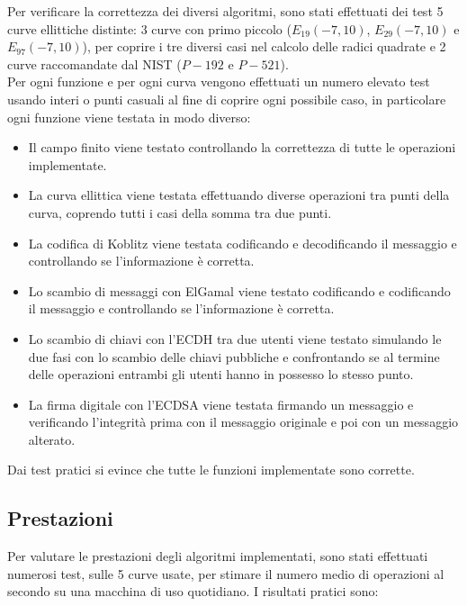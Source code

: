 \documentclass{article}
\begin{document}
	Per verificare la correttezza dei diversi algoritmi, sono stati effettuati dei test 5 curve ellittiche distinte: 
	3 curve con primo piccolo ($E_{19}(-7,10)$, $E_{29}(-7,10)$ e $E_{97}(-7,10)$), per coprire i tre diversi casi 
	nel calcolo delle radici quadrate e 2 curve raccomandate dal NIST ($P-192$ e $P-521$).\\
	
	Per ogni funzione e per ogni curva vengono effettuati un numero elevato test usando interi o punti casuali
	al fine di coprire ogni possibile caso,
	in particolare ogni funzione viene testata in modo diverso:
	
	\begin{itemize}
		\item Il campo finito viene testato controllando la correttezza di tutte le operazioni implementate.
		\item La curva ellittica viene testata effettuando diverse operazioni tra punti della curva, coprendo tutti i casi della somma tra due punti.
		\item La codifica di Koblitz viene testata codificando e decodificando il messaggio e controllando se l'informazione è corretta.
		\item Lo scambio di messaggi con ElGamal viene testato codificando e codificando il messaggio e controllando se l'informazione è corretta.
		\item Lo scambio di chiavi con l'ECDH tra due utenti viene testato simulando le due fasi con lo scambio delle chiavi pubbliche e confrontando se al termine delle operazioni entrambi gli utenti hanno in possesso lo stesso punto.
		\item La firma digitale con l'ECDSA viene testata firmando un messaggio e verificando l'integrità prima con il messaggio originale e poi con un messaggio alterato.
	\end{itemize}

	Dai test pratici si evince che tutte le funzioni implementate sono corrette.

	\clearpage
	\subsection{Prestazioni}

	Per valutare le prestazioni degli algoritmi implementati, sono stati effettuati numerosi test,
	sulle 5 curve usate, per stimare il numero medio di operazioni al secondo su una macchina di uso quotidiano.
	I risultati pratici sono:
	
\end{document}
